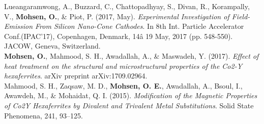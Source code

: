 \documentclass[a4paper,10pt]{article}
\begin{document}
Lueangaramwong, A., Buzzard, C., Chattopadhyay, S., Divan, R., Korampally, V., \textbf {Mohsen, O.}, \& Piot, P. (2017, May). \textit{Experimental Investigation of Field-Emission From Silicon Nano-Cone Cathodes}. In 8th Int. Particle Accelerator Conf.(IPAC'17), Copenhagen, Denmark, 14â 19 May, 2017 (pp. 548-550). JACOW, Geneva, Switzerland. \\

\textbf{Mohsen, O.}, Mahmood, S. H., Awadallah, A., \& Maswadeh, Y. (2017). \textit{Effect of heat treatment on the structural and microstructural properties of the Co2-Y hexaferrites}. arXiv preprint arXiv:1709.02964. \\


Mahmood, S. H., Zaqsaw, M. D., \textbf{Mohsen, O. E.}, Awadallah, A., Bsoul, I., Awawdeh, M., \& Mohaidat, Q. I. (2015). \textit{Modification of the Magnetic Properties of Co2Y Hexaferrites by Divalent and Trivalent Metal Substitutions}. Solid State Phenomena, 241, 93–125.
\end{document}
